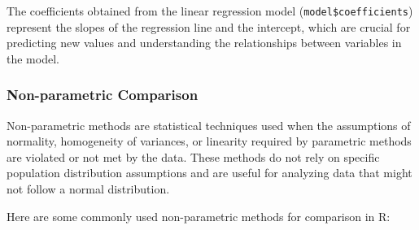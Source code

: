 \documentclass[
]{article}
\begin{document}
The coefficients obtained from the linear regression model
(\texttt{model\$coefficients}) represent the slopes of the regression
line and the intercept, which are crucial for predicting new values and
understanding the relationships between variables in the model.

\hypertarget{non-parametric-comparison}{%
\subsubsection{Non-parametric
Comparison}\label{non-parametric-comparison}}

Non-parametric methods are statistical techniques used when the
assumptions of normality, homogeneity of variances, or linearity
required by parametric methods are violated or not met by the data.
These methods do not rely on specific population distribution
assumptions and are useful for analyzing data that might not follow a
normal distribution.

Here are some commonly used non-parametric methods for comparison in R:
\end{document}
